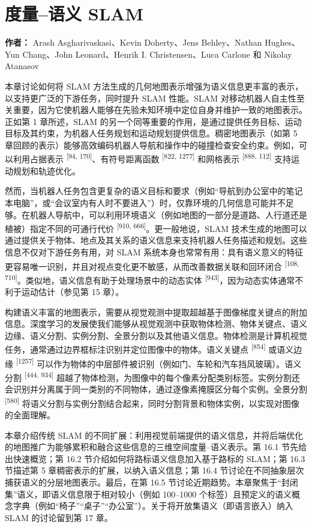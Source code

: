 \chapter{度量--语义 SLAM}

\textbf{作者：} Arash Asgharivaskasi、Kevin Doherty、Jens Behley、Nathan Hughes、Yun Chang、John Leonard、Henrik I. Christensen、Luca Carlone 和 Nikolay Atanasov

本章讨论如何将 SLAM 方法生成的几何地图表示增强为语义信息更丰富的表示，以支持更广泛的下游任务，同时提升 SLAM 性能。SLAM 对移动机器人自主性至关重要，因为它使机器人能够在先验未知环境中定位自身并维护一致的地图表示。正如第 1 章所述，SLAM 的另一个同等重要的作用，是通过提供任务目标、运动目标及其约束，为机器人任务规划和运动规划提供信息。稠密地图表示（如第 5 章回顾的表示）能够高效编码机器人导航和操作中的碰撞检查安全约束。例如，可以利用占据表示 \textsuperscript{[94, 170]}、有符号距离函数 \textsuperscript{[822, 1277]} 和网格表示 \textsuperscript{[888, 112]} 支持运动规划和轨迹优化。

然而，当机器人任务包含更复杂的语义目标和要求（例如“导航到办公室中的笔记本电脑”，或“会议室内有人时不要进入”）时，仅靠环境的几何信息可能并不足够。在机器人导航中，可以利用环境语义（例如地图的一部分是道路、人行道还是植被）指定不同的可通行代价 \textsuperscript{[910, 666]}。更一般地说，SLAM 技术生成的地图可以通过提供关于物体、地点及其关系的语义信息来支持机器人任务描述和规划。这些信息不仅对下游任务有用，对 SLAM 系统本身也常常有用：具有语义意义的特征更容易唯一识别，并且对视点变化更不敏感，从而改善数据关联和回环闭合 \textsuperscript{[108, 710]}。类似地，语义信息有助于处理场景中的动态实体 \textsuperscript{[943]}，因为动态实体通常不利于运动估计（参见第 15 章）。

构建语义丰富的地图表示，需要从视觉观测中提取超越基于图像梯度关键点的附加信息。深度学习的发展使我们能够从视觉观测中获取物体检测、物体关键点、语义边缘、语义分割、实例分割、全景分割以及其他语义信息。物体检测是计算机视觉任务，通常通过边界框标注识别并定位图像中的物体。语义关键点 \textsuperscript{[854]} 或语义边缘 \textsuperscript{[1257]} 可以作为物体的中层部件被识别（例如门、车轮和汽车挡风玻璃）。语义分割 \textsuperscript{[444, 934]} 超越了物体检测，为图像中的每个像素分配类别标签。实例分割还会识别并分离属于同一类别的不同物体，通过逐像素掩膜区分每个实例。全景分割 \textsuperscript{[580]} 将语义分割与实例分割结合起来，同时分割背景和物体实例，以实现对图像的全面理解。

本章介绍传统 SLAM 的不同扩展：利用视觉前端提供的语义信息，并将后端优化的地图推广为能够累积和融合这些信息的三维空间度量--语义表示。第 16.1 节先给出快速概览；第 16.2 节介绍如何将路标语义信息加入基于路标的 SLAM；第 16.3 节描述第 5 章稠密表示的扩展，以纳入语义信息；第 16.4 节讨论在不同抽象层次捕获语义的分层地图表示。最后，在第 16.5 节讨论近期趋势。本章聚焦于“封闭集”语义，即语义信息限于相对较小（例如 100--1000 个标签）且预定义的语义概念字典（例如“椅子”“桌子”“办公室”）。关于将开放集语义（即语言嵌入）纳入 SLAM 的讨论留到第 17 章。

